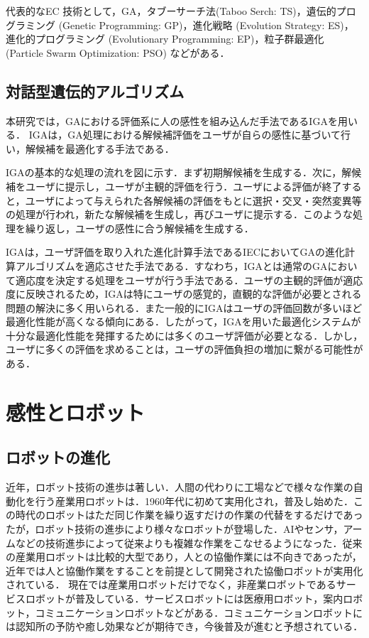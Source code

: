 代表的なEC 技術として，GA，タブーサーチ法(Taboo Serch: TS)，遺伝的プログラミング (Genetic Programming: GP)，進化戦略 (Evolution Strategy: ES)，進化的プログラミング (Evolutionary Programming: EP)，粒子群最適化 (Particle Swarm Optimization: PSO) などがある．
    
\subsection{対話型遺伝的アルゴリズム}
\label{sec2.2.2}

本研究では，GAにおける評価系に人の感性を組み込んだ手法であるIGAを用いる．
IGAは，GA処理における解候補評価をユーザが自らの感性に基づいて行い，解候補を最適化する手法である．

IGAの基本的な処理の流れを図に示す．まず初期解候補を生成する．次に，解候補をユーザに提示し，ユーザが主観的評価を行う．ユーザによる評価が終了すると，ユーザによって与えられた各解候補の評価をもとに選択・交叉・突然変異等の処理が行われ，新たな解候補を生成し，再びユーザに提示する．このような処理を繰り返し，ユーザの感性に合う解候補を生成する．

IGAは，ユーザ評価を取り入れた進化計算手法であるIECにおいてGAの進化計算アルゴリズムを適応させた手法である．すなわち，IGAとは通常のGAにおいて適応度を決定する処理をユーザが行う手法である．ユーザの主観的評価が適応度に反映されるため，IGAは特にユーザの感覚的，直観的な評価が必要とされる問題の解決に多く用いられる．また一般的にIGAはユーザの評価回数が多いほど最適化性能が高くなる傾向にある．したがって，IGAを用いた最適化システムが十分な最適化性能を発揮するためには多くのユーザ評価が必要となる．しかし，ユーザに多くの評価を求めることは，ユーザの評価負担の増加に繋がる可能性がある．



\newpage

\section{感性とロボット}
\label{sec2.3}

\subsection{ロボットの進化}
\label{sec2.3.1}
近年，ロボット技術の進歩は著しい．人間の代わりに工場などで様々な作業の自動化を行う産業用ロボットは．1960年代に初めて実用化され，普及し始めた．この時代のロボットはただ同じ作業を繰り返すだけの作業の代替をするだけであったが，ロボット技術の進歩により様々なロボットが登場した．AIやセンサ，アームなどの技術進歩によって従来よりも複雑な作業をこなせるようになった．従来の産業用ロボットは比較的大型であり，人との協働作業には不向きであったが，近年では人と協働作業をすることを前提として開発された協働ロボットが実用化されている．
現在では産業用ロボットだけでなく，非産業ロボットであるサービスロボットが普及している．サービスロボットには医療用ロボット，案内ロボット，コミュニケーションロボットなどがある．コミュニケーションロボットには認知所の予防や癒し効果などが期待でき，今後普及が進むと予想されている．


